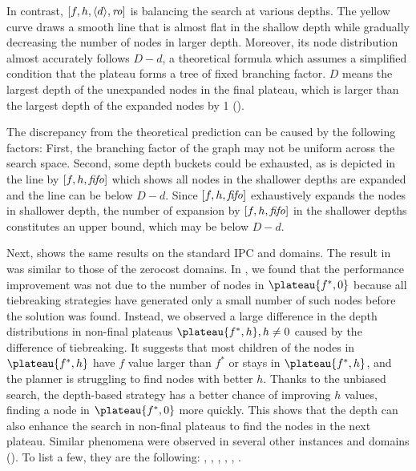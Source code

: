 In contrast, $[f,h,{\left<d\right>},{\text{\textit{ro}}}]$ is balancing the search at various depths.
The yellow curve draws a smooth line that is almost flat in the shallow depth while gradually decreasing the number of nodes in larger depth.
Moreover, its node distribution almost accurately follows $D-d$, a theoretical formula which assumes a simplified
condition that the plateau forms a tree of fixed branching factor.
$D$ means the largest depth of the unexpanded nodes in the final plateau, which is
larger than the largest depth of the expanded nodes by 1
().

The discrepancy from the theoretical prediction can be caused by the 
following factors: First, the branching factor of the graph may not be
uniform across the search space. Second, some depth buckets could be
exhausted, as is depicted in the line by $[f,h,{\text{\textit{fifo}}}]$ which
shows all nodes in the shallower depths are expanded and the line can be below $D-d$.
Since $[f,h,{\text{\textit{fifo}}}]$ exhaustively expands the nodes in shallower depth,
the number of expansion by $[f,h,{\text{\textit{fifo}}}]$ in the shallower depths constitutes an upper bound, which may be below $D-d$.

Next,  shows the same results on the standard IPC
 and  domains.
The result in  was similar to those of the zerocost domains.
In ,
we found that the performance improvement was not due to the number of nodes in $\plateau{f^*,0}$ because all tiebreaking strategies have generated only a small number of such nodes before the solution was found.
Instead, we observed a large difference in the depth distributions in non-final plateaus $\plateau{f^*,h}, h\not=0$ caused by the difference of tiebreaking.
It suggests that most children of the nodes in $\plateau{f^*,h}$ have $f$ value larger than $f^*$ or stays in $\plateau{f^*,h}$, and the planner is struggling to find nodes with better $h$.
Thanks to the unbiased search, the depth-based strategy has a better chance of improving $h$ values, finding a node in $\plateau{f^*,0}$ more quickly.
This shows that the depth can also enhance the search in non-final plateaus to find the nodes in the next plateau.
Similar phenomena were observed in several other instances and domains (). To list a few, they are the following: , , , , , .

